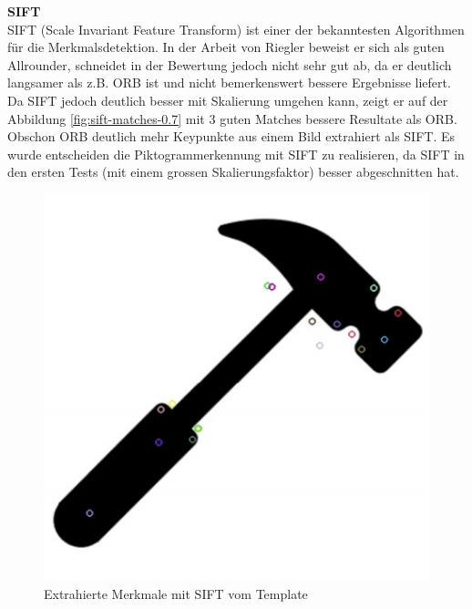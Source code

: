 \textbf{SIFT}\\
SIFT (Scale Invariant Feature Transform) ist einer der bekanntesten Algorithmen für die Merkmalsdetektion. In der Arbeit von Riegler \cite{feature-matching-riegler-ma} beweist er sich als guten Allrounder, schneidet in der Bewertung jedoch nicht sehr gut ab, da er deutlich langsamer als z.B. ORB ist und nicht bemerkenswert bessere Ergebnisse liefert. Da SIFT jedoch deutlich besser mit Skalierung umgehen kann, zeigt er auf der Abbildung \ref{fig:sift-matches-0.7} mit 3 guten Matches bessere Resultate als ORB. Obschon ORB deutlich mehr Keypunkte aus einem Bild extrahiert als SIFT. Es wurde entscheiden die Piktogrammerkennung mit SIFT zu realisieren, da SIFT in den ersten Tests (mit einem grossen Skalierungsfaktor) besser abgeschnitten hat.

\begin{figure}[H]
  \centering
  \begin{minipage}[t]{0.45\linewidth}
  \includegraphics[width=1.0\textwidth]{img/piktogrammerkennung/sift_kp1.jpg}
  \caption{Extrahierte Merkmale mit SIFT vom Template}
  \label{fig:sift-kp1}
  \end{minipage} 
  \hfill
  \begin{minipage}[t]{0.45\linewidth}

\end{minipage}
\end{figure}
